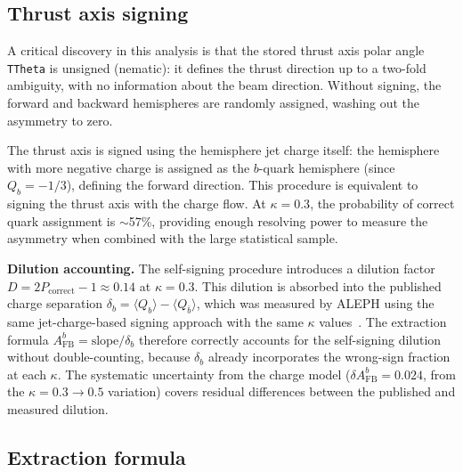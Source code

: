 \documentclass[11pt,a4paper]{article}
\begin{document}
\subsection{Thrust axis signing}
\label{sec:thrust-signing}

A critical discovery in this analysis is that the stored thrust axis
polar angle \texttt{TTheta} is unsigned (nematic): it defines the
thrust direction up to a two-fold ambiguity, with no information about
the beam direction.  Without signing, the forward and backward
hemispheres are randomly assigned, washing out the asymmetry to zero.

The thrust axis is signed using the hemisphere jet charge itself: the
hemisphere with more negative charge is assigned as the $b$-quark
hemisphere (since $Q_b = -1/3$), defining the forward direction.  This
procedure is equivalent to signing the thrust axis with the charge flow.
At $\kappa = 0.3$, the probability of correct quark assignment is
$\sim$57\%, providing enough resolving power to measure the asymmetry
when combined with the large statistical sample.

\textbf{Dilution accounting.}
The self-signing procedure introduces a dilution factor
$D = 2P_\mathrm{correct} - 1 \approx 0.14$ at $\kappa = 0.3$.  This
dilution is absorbed into the published charge separation
$\delta_b = \langle Q_b \rangle - \langle Q_{\bar{b}} \rangle$, which
was measured by ALEPH using the same jet-charge-based signing approach
with the same $\kappa$ values~\cite{ALEPH:AFBb}.  The extraction formula
$A_\mathrm{FB}^b = \mathrm{slope}/\delta_b$ therefore correctly accounts
for the self-signing dilution without double-counting, because $\delta_b$
already incorporates the wrong-sign fraction at each $\kappa$.  The
systematic uncertainty from the charge model ($\delta A_\mathrm{FB}^b
= 0.024$, from the $\kappa = 0.3 \to 0.5$ variation) covers residual
differences between the published and measured dilution.

\subsection{Extraction formula}
\end{document}
